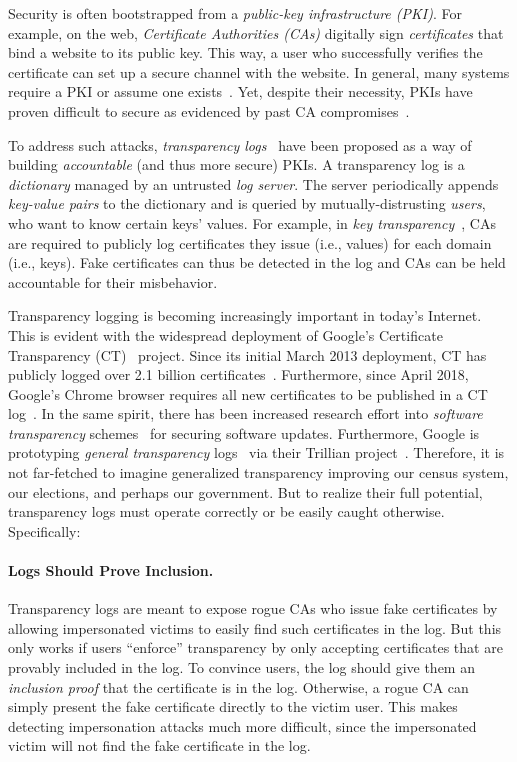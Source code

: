 \aadPreviousWorkTable

Security is often bootstrapped from a \textit{public-key infrastructure (PKI)}.
For example, on the web, \textit{Certificate Authorities (CAs)} digitally sign \textit{certificates} that bind a website to its public key.
This way, a user who successfully verifies the certificate can set up a secure channel with the website.
In general, many systems require a PKI or assume one exists~\cite{frientegrity,LKMS04,mylar,sporc}.
Yet, despite their necessity, PKIs have proven difficult to secure as evidenced by past CA compromises~\cite{mitmgoogle,cahacks,cahacksurvey}.

To address such attacks, \textit{transparency logs}~\cite{ht,ct,ELC16} have been proposed as a way of building \textit{accountable} (and thus more secure) PKIs.
A transparency log is a \textit{dictionary} managed by an untrusted \textit{log server}.
The server periodically appends \textit{key-value pairs} to the dictionary   and is queried by mutually-distrusting \textit{users}, who want to know certain keys' values.
For example, in \textit{key transparency}~\cite{ct,Ryan2014,coniks,aki,arpki,BuldasLaudLipmaa2000,policert,dtki}, CAs are required to publicly log certificates they issue (i.e., values) for each domain (i.e., keys).
Fake certificates can thus be detected in the log and CAs can be held accountable for their misbehavior.

Transparency logging is becoming increasingly important in today's Internet.
This is evident with the widespread deployment of Google's Certificate Transparency (CT)~\cite{ct} project.
Since its initial March 2013 deployment, CT has publicly logged over 2.1 billion certificates~\cite{ct-num-certs}.
Furthermore, since April 2018, Google's Chrome browser requires all new certificates to be published in a CT log~\cite{ct-google-chrome}.
In the same spirit, there has been increased research effort into \textit{software transparency} schemes~\cite{contour,at,chainiac,software-dist-transparency,TD17,STV+16} for securing software updates.
Furthermore, Google is prototyping \textit{general transparency} logs~\cite{ELC16,trillian} via their Trillian project~\cite{trillian}.
Therefore, it is not far-fetched to imagine generalized transparency improving our census system, our elections, and perhaps our government.
But to realize their full potential, transparency logs must operate correctly or be easily caught otherwise.
Specifically:

\paragraph{Logs Should Prove Inclusion.}
Transparency logs are meant to expose rogue CAs who issue fake certificates by allowing impersonated victims to easily find such certificates in the log.
But this only works if users ``enforce'' transparency by only accepting certificates that are provably included in the log.
To convince users, the log should give them an \textit{inclusion proof} that the certificate is in the log.
Otherwise, a rogue CA can simply present the fake certificate directly to the victim user.
This makes detecting impersonation attacks much more difficult, since the impersonated victim will not find the fake certificate in the log.

